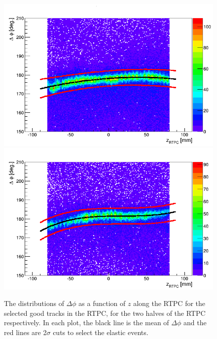 \begin{figure}[tp]
\includegraphics[scale=0.34]{fig_rtpc/delta_phi_z_l.png}
\includegraphics[scale=0.34]{fig_rtpc/delta_phi_z_r.png}
\caption[]{The distributions of $\Delta \phi$ as a function of $z$ along the RTPC for the selected good tracks in the RTPC, for the two halves of the RTPC respectively. In each plot, the black line is the mean of $\Delta \phi$ and the red lines are 2$\sigma$ cuts to select the elastic events.} 
\label{fig:delta_phi_elastic}
\end{figure} 

